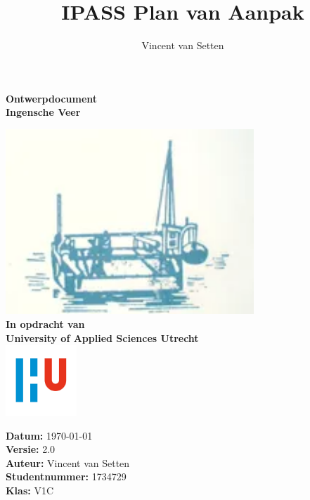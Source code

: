 \documentclass{article}
\title{IPASS Plan van Aanpak}
\author{Vincent van Setten}
\begin{document}
\begin{titlepage}
    \begin{center}
        \vspace*{.6cm}
        \Huge
        \textbf{Ontwerpdocument }\\
        \vspace{0.2cm}
        \LARGE 
        \textbf{Ingensche Veer} \\
  
        \normalsize
  
  
        \vspace{1cm}
        \includegraphics[width=0.7\textwidth]{images/iv.png}
        \vspace{1cm}
        \Large\\
        \textbf{In opdracht van}\\
        \large
        \textbf{University of Applied Sciences Utrecht} \\
        \includegraphics[width=0.2\textwidth]{images/logouni.jpg}
  
        \vfill
      \end{center}
      \textbf{Datum:} \today \\
      \textbf{Versie:} 2.0 \\
      \textbf{Auteur:} Vincent van Setten \\
      \textbf{Studentnummer:} 1734729 \\
      \textbf{Klas:} V1C\\
  
  \end{titlepage}
  
\end{document}
